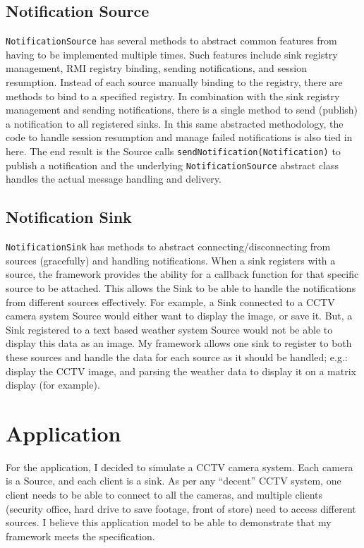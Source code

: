 \documentclass[a4paper]{article}
\begin{document}
\subsection{Notification Source}
\texttt{NotificationSource} has several methods to abstract common features from having to be implemented multiple times.
Such features include sink registry management, RMI registry binding, sending notifications, and session resumption.
Instead of each source manually binding to the registry, there are methods to bind to a specified registry.
In combination with the sink registry management and sending notifications, there is a single method to send (publish) a notification to all registered sinks.
In this same abstracted methodology, the code to handle session resumption and manage failed notifications is also tied in here.
The end result is the Source calls \texttt{sendNotification(Notification)} to publish a notification and the underlying \texttt{NotificationSource} abstract class handles the actual message handling and delivery.

\subsection{Notification Sink}
\texttt{NotificationSink} has methods to abstract connecting/disconnecting from sources (gracefully) and handling notifications.
When a sink registers with a source, the framework provides the ability for a callback function for that specific source to be attached.
This allows the Sink to be able to handle the notifications from different sources effectively.
For example, a Sink connected to a CCTV camera system Source would either want to display the image, or save it.
But, a Sink registered to a text based weather system Source would not be able to display this data as an image.
My framework allows one sink to register to both these sources and handle the data for each source as it should be handled;
e.g.: display the CCTV image, and parsing the weather data to display it on a matrix display (for example).

\section{Application}
For the application, I decided to simulate a CCTV camera system.
Each camera is a Source, and each client is a sink.
As per any ``decent'' CCTV system, one client needs to be able to connect to all the cameras, and multiple clients (security office, hard drive to save footage, front of store) need to access different sources.
I believe this application model to be able to demonstrate that my framework meets the specification.
\end{document}
